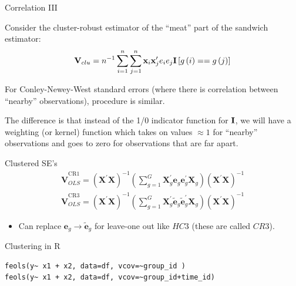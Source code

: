 \begin{frame}{Correlation III}

 Consider the cluster-robust estimator of the ``meat'' part of the sandwich estimator: \[
	{\bf V}_{clu} = n^{-1} \sum_{i=1}^{n}\sum_{j=1}^{n} {\bf x}_i {\bf x}'_j  e_i e_j {\bf I}\left[g\left(i\right)==g\left(j\right)\right]
	\]

\medskip
 For Conley-Newey-West standard errors (where there is correlation between ``nearby'' observations),
	procedure is similar.

\medskip
	 The difference is that instead of the 1/0 indicator function for ${\bf I}$, we will have a 
	weighting (or kernel) function which takes on values $\approx 1$ for ``nearby'' observations and goes to zero for
	observations that are far apart.


\end{frame}



\begin{frame}{Clustered SE's}
\begin{align*}
\widehat { \boldsymbol { V } } _ { OLS } ^ { \mathrm { CR } 1 } = \left( \boldsymbol { X } ^ { \prime } \boldsymbol { X } \right) ^ { - 1 } \left( \sum _ { g = 1 } ^ { G } \boldsymbol { X } _ { g } ^ { \prime } \boldsymbol { e }_ { g }  \boldsymbol { e }_ { g } ^ { \prime } \boldsymbol { X } _ { g } \right) \left( \boldsymbol { X } ^ { \prime } \boldsymbol { X } \right) ^ { - 1 }\\
\widehat { \boldsymbol { V } } _ { OLS } ^ { \mathrm { CR } 3 } = \left( \boldsymbol { X } ^ { \prime } \boldsymbol { X } \right) ^ { - 1 } \left( \sum _ { g = 1 } ^ { G } \boldsymbol { X } _ { g } ^ { \prime } \widetilde { \boldsymbol { e } } _ { g }  \widetilde { \boldsymbol { e } } _ { g } ^ { \prime } \boldsymbol { X } _ { g } \right) \left( \boldsymbol { X } ^ { \prime } \boldsymbol { X } \right) ^ { - 1 }
\end{align*}
\begin{itemize}
\item Can replace  $\mathbf{e}_g  \rightarrow \tilde { \mathbf{e}}_g $ for leave-one out like $HC3$ (these are called $CR3$).
\end{itemize}
\end{frame}


\begin{frame}[fragile]{Clustering in R}
\begin{lstlisting}
feols(y~ x1 + x2, data=df, vcov=~group_id )
feols(y~ x1 + x2, data=df, vcov=~group_id+time_id)
\end{lstlisting}
\end{frame}





